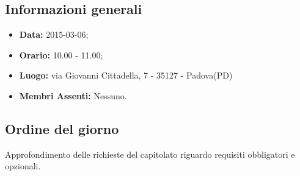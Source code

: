 \subsection{Informazioni generali}
\begin{itemize}
	\item \textbf{Data:} 2015-03-06;
	\item \textbf{Orario:} 10.00 - 11.00;
	\item \textbf{Luogo:} via Giovanni Cittadella, 7 - 35127 - Padova(PD)
	\item \textbf{Membri Assenti:} Nessuno.
\end{itemize}

\subsection{Ordine del giorno}
Approfondimento delle richieste del capitolato riguardo requisiti obbligatori e opzionali.

